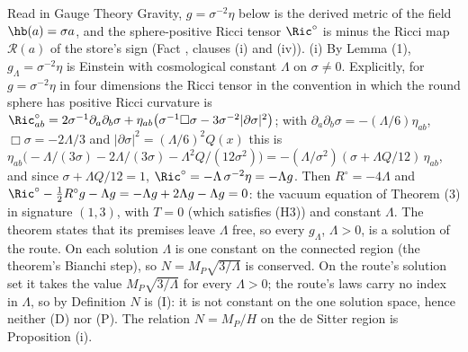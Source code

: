 Read in Gauge Theory Gravity, $g = \sigma^{-2}\eta$ below is the derived metric of the field $\hb(a) = \sigma a$, and the sphere-positive Ricci tensor $\Ric^{\circ}$ is minus the Ricci map $\mathcal{R}(a)$ of the store's sign (Fact , clauses (i) and (iv)). (i) By Lemma (1), $g_{\Lambda} = \sigma^{-2}\eta$ is Einstein with cosmological constant $\Lambda$ on $\sigma \neq 0$. Explicitly, for $g = \sigma^{-2}\eta$ in four dimensions the Ricci tensor in the convention in which the round sphere has positive Ricci curvature is $\Ric^{\circ}_{ab} = 2\sigma^{-1}\partial_{a}\partial_{b}\sigma + \eta_{ab}\bigl(\sigma^{-1}\Box\sigma - 3\sigma^{-2}|\partial\sigma|^{2}\bigr)$; with $\partial_{a}\partial_{b}\sigma = -(\Lambda/6)\eta_{ab}$, $\Box\sigma = -2\Lambda/3$ and $|\partial\sigma|^{2} = (\Lambda/6)^{2}Q(x)$ this is $\eta_{ab}\bigl(-\Lambda/(3\sigma) - 2\Lambda/(3\sigma) - \Lambda^{2}Q/(12\sigma^{2})\bigr) = -(\Lambda/\sigma^{2})(\sigma + \Lambda Q/12)\,\eta_{ab}$, and since $\sigma + \Lambda Q/12 = 1$, $\Ric^{\circ} = -\Lambda\,\sigma^{-2}\eta = -\Lambda g$. Then $R^{\circ} = -4\Lambda$ and $\Ric^{\circ} - \tfrac12R^{\circ}g - \Lambda g = -\Lambda g + 2\Lambda g - \Lambda g = 0$: the vacuum equation of Theorem (3) in signature $(1,3)$, with $T = 0$ (which satisfies (H3)) and constant $\Lambda$. The theorem states that its premises leave $\Lambda$ free, so every $g_{\Lambda}$, $\Lambda > 0$, is a solution of the route. On each solution $\Lambda$ is one constant on the connected region (the theorem's Bianchi step), so $N = M_{P}\sqrt{3/\Lambda}$ is conserved. On the route's solution set it takes the value $M_{P}\sqrt{3/\Lambda}$ for every $\Lambda > 0$; the route's laws carry no index in $\Lambda$, so by Definition  $N$ is (I): it is not constant on the one solution space, hence neither (D) nor (P). The relation $N = M_{P}/H$ on the de Sitter region is Proposition (i).

